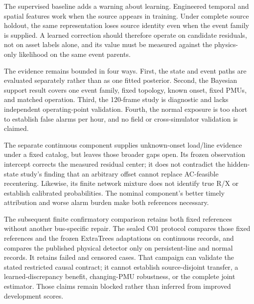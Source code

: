 The supervised baseline adds a warning about learning. Engineered temporal and spatial features work when the source appears in training. Under complete source holdout, the same representation loses source identity even when the event family is supplied. A learned correction should therefore operate on candidate residuals, not on asset labels alone, and its value must be measured against the physics-only likelihood on the same event parents.

The evidence remains bounded in four ways. First, the state and event paths are evaluated separately rather than as one fitted posterior. Second, the Bayesian support result covers one event family, fixed topology, known onset, fixed PMUs, and matched operation. Third, the 120-frame study is diagnostic and lacks independent operating-point validation. Fourth, the normal exposure is too short to establish false alarms per hour, and no field or cross-simulator validation is claimed.

The separate continuous component supplies unknown-onset load/line evidence under a fixed catalog, but leaves those broader gaps open. Its frozen observation intercept corrects the measured residual center; it does not contradict the hidden-state study's finding that an arbitrary offset cannot replace AC-feasible recentering. Likewise, its finite network mixture does not identify true R/X or establish calibrated probabilities. The nominal component's better timely attribution and worse alarm burden make both references necessary.

The subsequent finite confirmatory comparison retains both fixed references without another bus-specific repair. The sealed C01 protocol compares those fixed references and the frozen ExtraTrees adaptations on continuous records, and compares the published physical detector only on persistent-line and normal records. It retains failed and censored cases. That campaign can validate the stated restricted causal contract; it cannot establish source-disjoint transfer, a learned-discrepancy benefit, changing-PMU robustness, or the complete joint estimator. Those claims remain blocked rather than inferred from improved development scores.
